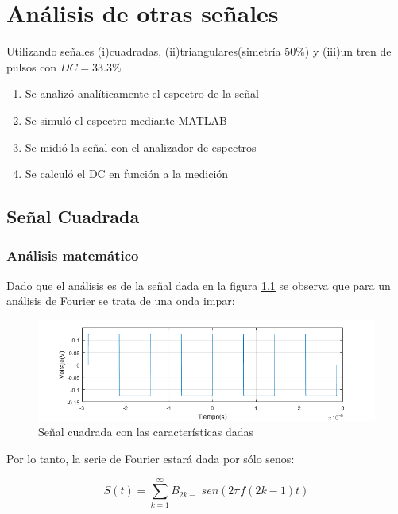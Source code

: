 \chapter{Análisis de otras señales}
Utilizando señales (i)cuadradas, (ii)triangulares(simetría 50\%) y (iii)un tren de pulsos con $DC=33.3\%$
\begin{enumerate}
    \item Se analizó analíticamente el espectro de la señal
    \item Se simuló el espectro mediante MATLAB
    \item Se midió la señal con el analizador de espectros
    \item Se calculó el DC en función a la medición
\end{enumerate}

\section{Señal Cuadrada}
    \subsection{Análisis matemático}

    Dado que el análisis es de la señal dada en la figura \ref{fig:2,1,1}
    se observa que para un análisis de Fourier se trata de una onda
    impar:

    \begin{figure}[ht]
        \begin{center}
            \includegraphics[width=\linewidth]{contenido/img/sig_sqr.png}
            \caption{Señal cuadrada con las características dadas}
            \label{fig:2,1,1}
        \end{center}
    \end{figure}

    Por lo tanto, la serie de Fourier estará dada por sólo senos:

    \begin{equation}
        S(t) = \sum_{k=1}^{\infty} B_{2k-1} sen(2 \pi f (2k-1) t)
    \end{equation}

